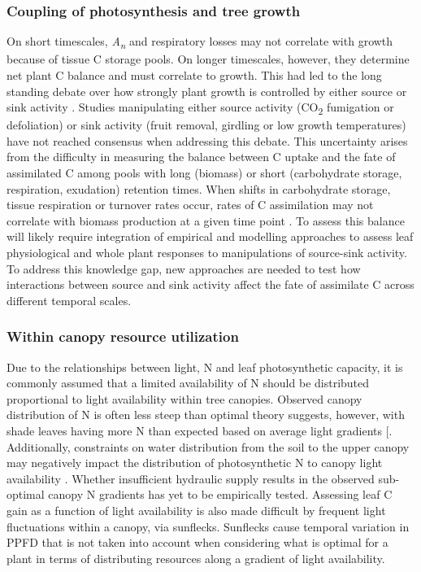\documentclass[a4paper]{article}
\begin{document}
\subsubsection*{Coupling of photosynthesis and tree growth}
On short timescales, \textit{A\textsubscript{n}} and respiratory losses may not correlate with growth because of tissue C storage pools. On longer timescales, however, they determine net plant C balance and must correlate to growth. This had led to the long standing debate over how strongly plant growth is controlled by either source or sink activity \citep{sweet1966role, korner2013growth}. Studies manipulating either source activity (CO\textsubscript{2} fumigation or defoliation) or sink activity (fruit removal, girdling or low growth temperatures) have not reached consensus when addressing this debate. This uncertainty arises from the difficulty in measuring the balance between C uptake and the fate of assimilated C among pools with long (biomass) or short (carbohydrate storage, respiration, exudation) retention times. When shifts in carbohydrate storage, tissue respiration or turnover rates occur, rates of C assimilation may not correlate with biomass production at a given time point \citep{rocha2006linking, litton2007carbon, gough2008multi}. To assess this balance will likely require integration of empirical and modelling approaches to assess leaf physiological and whole plant responses to manipulations of source-sink activity. To address this knowledge gap, new approaches are needed to test how interactions between source and sink activity affect the fate of assimilate C across different temporal scales. 

\subsubsection*{Within canopy resource utilization}
Due to the relationships between light, N and leaf photosynthetic capacity, it is commonly assumed that a limited availability of N should be distributed proportional to light availability within tree canopies. Observed canopy distribution of N is often less steep than optimal theory suggests, however, with shade leaves having more N than expected based on average light gradients [\citep{peltoniemi2012co}. Additionally, constraints on water distribution from the soil to the upper canopy may negatively impact the distribution of photosynthetic N to canopy light availability \citep{niinemets2012optimization, peltoniemi2012co}. Whether insufficient hydraulic supply results in the observed sub-optimal canopy N gradients has yet to be empirically tested. Assessing leaf C gain as a function of light availability is also made difficult by frequent light fluctuations within a canopy, via sunflecks. Sunflecks cause temporal variation in PPFD that is not taken into account when considering what is optimal for a plant in terms of distributing resources along a gradient of light availability.
\end{document}

